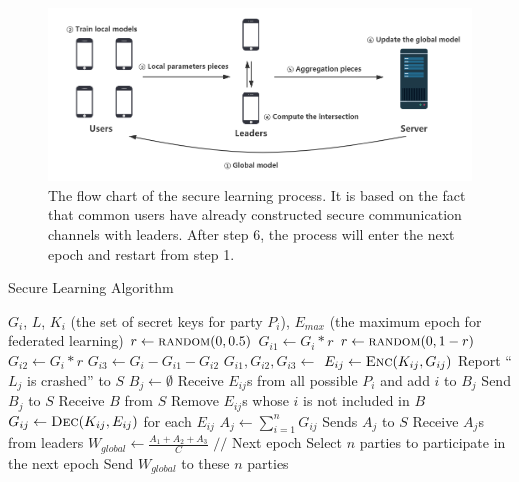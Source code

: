 \begin{figure}[!ht]
    \centering
    \includegraphics[width=2\columnwidth]{img/alg.png}
    \caption{The flow chart of the secure learning process. It is based on the fact that common users have already constructed secure communication channels with leaders. After step 6, the process will enter the next epoch and restart from step 1.}
    \label{fig-alg}
\end{figure}

\begin{algorithm}
    \label{sec-learning}
    \caption{Secure Learning Algorithm}
    \begin{algorithmic}[1] 
        \Require $G_i$, $L$, $K_i$ (the set of secret keys for party $P_i$), $E_{max}$ (the maximum epoch for federated learning)
            \State $r \gets \Call{random}{0, 0.5}$
            \State $G_{i1} \gets G_i * r$
            \State $r \gets \Call{random}{0, 1-r}$
            \State $G_{i2} \gets G_i * r$
            \State $G_{i3} \gets G_i - G_{i1} - G_{i2}$
            \State {}
        \EndFunction
        \State
            \State $G_{i1}, G_{i2}, G_{i3} \gets$ 
                \State $E_{ij} \gets \Call{Enc}{K_{ij}, G_{ij}}$
                    \State Report ``$L_j$ is crashed'' to $S$
                \EndIf
            \EndFor
        \EndFunction
        \State
            \State $B_j \gets \emptyset$
            \State Receive $E_{ij}$s from all possible $P_i$ and add $i$ to $B_j$
            \State Send $B_j$ to $S$
            \State Receive $B$ from $S$
            \State Remove $E_{ij}$s whose $i$ is not included in $B$
            \State $G_{ij} \gets \Call{Dec}{K_{ij}, E_{ij}}$ for each $E_{ij}$
            \State $A_j \gets \sum_{i=1}^nG_{ij}$
            \State Sends $A_j$ to $S$
        \EndFunction
        \State
                \State {}
            \EndIf
            \State Receive $A_j$s from leaders
            \State $W_{global} \gets \frac{A_1 + A_2 + A_3}{C} $
            \State {} 
            \State $//$ Next epoch
            \State Select $n$ parties to participate in the next epoch
            \State Send $W_{global}$ to these $n$ parties
            \State {}
        \EndFunction
    \end{algorithmic}
\end{algorithm}


